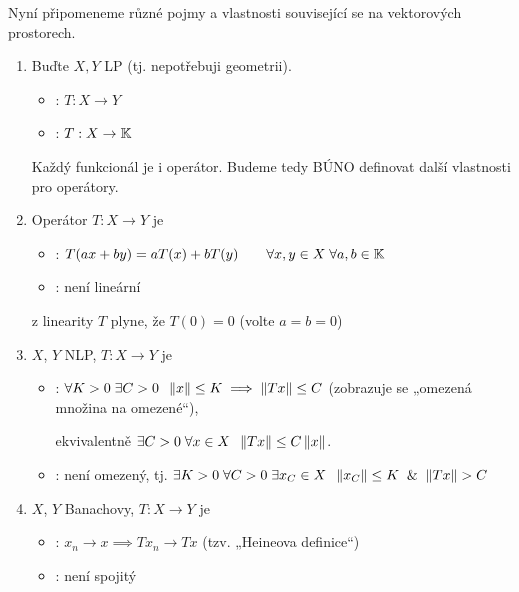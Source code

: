 Nyní připomeneme různé pojmy a vlastnosti související se  na vektorových prostorech.
\begin{enumerate}
    \item Buďte $X,Y$ LP (tj. nepotřebuji geometrii).
    \begin{itemize}
        \item {}: $T: X \to Y$
        \item {}: $T: X \to \mathbb{K}$
    \end{itemize}
    Každý funkcionál je i operátor. Budeme tedy BÚNO definovat další vlastnosti pro operátory.
    
    \item Operátor $T: X \to Y$ je
    \begin{itemize}
        \item {}: $T(ax + by) = a T(x) + b T(y) \hspace{2em} \forall x,y \in X \; \forall a,b \in \mathbb{K}$
        \item {}: není lineární
    \end{itemize}
    
    \Poznamka z linearity $T$ plyne, že $T(0) = 0$ (volte $a=b=0$)
    
    \item $X$, $Y$ NLP, $T: X \to Y$ je
    \begin{itemize}
        \item {}: $\forall K>0 \; \exists C>0 \;\; \left\lVert x\right\rVert \leq K \implies \left\lVert Tx\right\rVert \leq C$ (zobrazuje se „omezená množina na omezené“),
        
        ekvivalentně $\exists C>0 \; \forall x \in X \;\; \left\lVert Tx\right\rVert \leq C \left\lVert x\right\rVert $.
        
        \item {}: není omezený, tj. $\exists K>0 \; \forall C>0 \; \exists x_C \in X \;\; \norm{x_C} \leq K \And \norm{Tx} > C$
    \end{itemize}
    
    \item $X$, $Y$ Banachovy, $T: X \to Y$ je
    \begin{itemize}
        \item {}: $x_n \to x \implies T x_n \to T x$ (tzv. „Heineova definice“)
        
        \item {}: není spojitý
    \end{itemize}
\end{enumerate}

